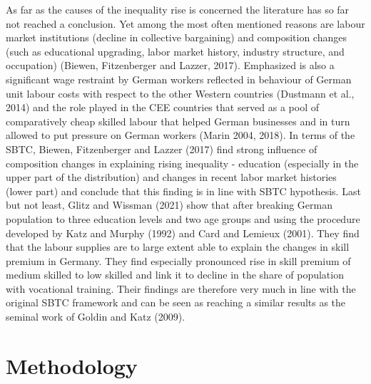 \documentclass{article}
\begin{document}


As far as the causes of the inequality rise is concerned the literature has so far not reached a conclusion. Yet among the most often mentioned reasons are labour market institutions (decline in collective bargaining) and composition changes (such as educational upgrading, labor market history, industry structure, and occupation) (Biewen, Fitzenberger and Lazzer, 2017). Emphasized is also a significant wage restraint by German workers reflected in behaviour of German unit labour costs with respect to the other Western countries (Dustmann et al., 2014) and the role played in the CEE countries that served as a pool of comparatively cheap skilled labour that helped German businesses and in turn allowed to put pressure on German workers (Marin 2004, 2018).
In terms of the SBTC, Biewen, Fitzenberger and Lazzer (2017) find strong influence of composition changes in explaining rising inequality - education (especially in the upper part of the distribution) and changes in recent labor market histories (lower part) and conclude that this finding is in line with SBTC hypothesis.
Last but not least, Glitz and Wissman (2021) show that after breaking German population to three education levels and two age groups and using the procedure developed by Katz and Murphy (1992) and Card and Lemieux (2001). They find that the labour supplies are to large extent able to explain the changes in skill premium in Germany. They find especially pronounced rise in skill premium of medium skilled to low skilled and link it to decline in the share of population with vocational training. Their findings are therefore very much in line with the original SBTC framework and can be seen as reaching a similar results as the seminal work of Goldin and Katz (2009). %


\section{Methodology}
\end{document}

